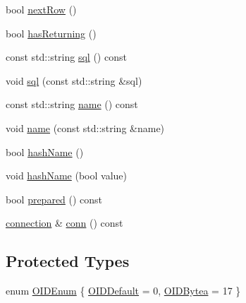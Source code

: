 \begin{DoxyCompactItemize}
\item 
bool \hyperlink{classdbo_1_1stmt_1_1_prepared_statement_a8b8b2bcc94ec90843377abafa66e82bb}{next\+Row} ()
\item 
bool \hyperlink{classdbo_1_1stmt_1_1_prepared_statement_a692c0e545c07d818970a208320a03861}{has\+Returning} ()
\item 
const std\+::string \hyperlink{classdbo_1_1stmt_1_1_prepared_statement_a5413f8367e7cfcba4a2dfedc11726509}{sql} () const 
\item 
void \hyperlink{classdbo_1_1stmt_1_1_prepared_statement_ad931d49d80287d23b2effa146a8b2cbc}{sql} (const std\+::string \&sql)
\item 
const std\+::string \hyperlink{classdbo_1_1stmt_1_1_prepared_statement_ad27a0d0ecf8fbe1105ab31d22474a63b}{name} () const 
\item 
void \hyperlink{classdbo_1_1stmt_1_1_prepared_statement_a41a02c96f4fa92db99a7e22dd8544589}{name} (const std\+::string \&name)
\item 
bool \hyperlink{classdbo_1_1stmt_1_1_prepared_statement_a134a6e252ce65627fe0183dee3889118}{hash\+Name} ()
\item 
void \hyperlink{classdbo_1_1stmt_1_1_prepared_statement_a4f037bb4aa0db19d7f1ec282c491d3d3}{hash\+Name} (bool value)
\item 
bool \hyperlink{classdbo_1_1stmt_1_1_prepared_statement_a35dda0d6c5484b0a9ec65a5006262fc0}{prepared} () const 
\item 
\hyperlink{classdbo_1_1connection}{connection} \& \hyperlink{classdbo_1_1stmt_1_1_prepared_statement_acb0c5498031d397325904b976581864e}{conn} () const 
\end{DoxyCompactItemize}
\subsection*{Protected Types}
\begin{DoxyCompactItemize}
\item 
enum \hyperlink{classdbo_1_1stmt_1_1_prepared_statement_a5abdfcba0e0d11c61c0ad555aa7ec053}{O\+I\+D\+Enum} \{ \hyperlink{classdbo_1_1stmt_1_1_prepared_statement_a5abdfcba0e0d11c61c0ad555aa7ec053a2722e683704ee721128f523886c0d5c9}{O\+I\+D\+Default} = 0, 
\hyperlink{classdbo_1_1stmt_1_1_prepared_statement_a5abdfcba0e0d11c61c0ad555aa7ec053a1d0b87b3b8ab7d5f47a4da1b09c44c74}{O\+I\+D\+Bytea} = 17
 \}
\end{DoxyCompactItemize}
